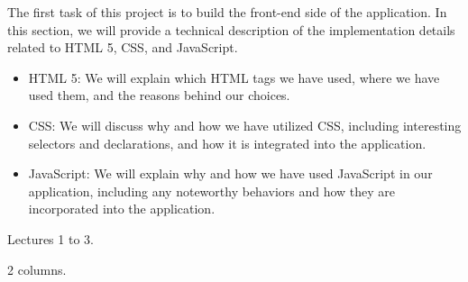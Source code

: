The first task of this project is to build the front-end side of the application.
In this section, we will provide a technical description of the implementation details related to HTML 5, CSS, and JavaScript.\newline

\begin{itemize}
    \item HTML 5: We will explain which HTML tags we have used, where we have used them, and the reasons behind our choices.
    \item CSS: We will discuss why and how we have utilized CSS, including interesting selectors and declarations, and how it is integrated into the application.
    \item JavaScript: We will explain why and how we have used JavaScript in our application, including any noteworthy behaviors and how they are incorporated into the application.
\end{itemize}

 Lectures 1 to 3.

 2 columns.
